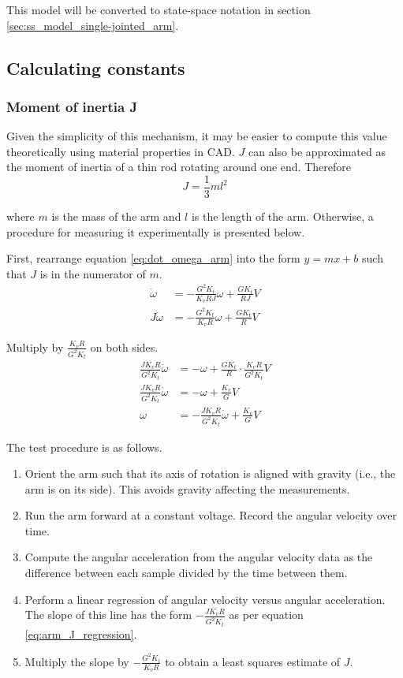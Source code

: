 This model will be converted to state-space notation in section
\ref{sec:ss_model_single-jointed_arm}.

\subsection{Calculating constants}

\subsubsection{Moment of inertia J}

Given the simplicity of this mechanism, it may be easier to compute this value
theoretically using material properties in CAD. $J$ can also be approximated as
the moment of inertia of a thin rod rotating around one end. Therefore
\begin{equation}
  J = \frac{1}{3}ml^2
\end{equation}

where $m$ is the mass of the arm and $l$ is the length of the arm. Otherwise, a
procedure for measuring it experimentally is presented below.

First, rearrange equation \eqref{eq:dot_omega_arm} into the form $y = mx + b$
such that $J$ is in the numerator of $m$.
\begin{align*}
  \dot{\omega} &= -\frac{G^2 K_t}{K_v RJ} \omega + \frac{G K_t}{RJ} V \\
  J\dot{\omega} &= -\frac{G^2 K_t}{K_v R} \omega + \frac{G K_t}{R} V
\end{align*}

Multiply by $\frac{K_v R}{G^2 K_t}$ on both sides.
\begin{align}
  \frac{J K_v R}{G^2 K_t} \dot{\omega} &= -\omega + \frac{G K_t}{R} \cdot
    \frac{K_v R}{G^2 K_t} V \nonumber \\
  \frac{J K_v R}{G^2 K_t} \dot{\omega} &= -\omega + \frac{K_v}{G} V \nonumber \\
  \omega &= -\frac{J K_v R}{G^2 K_t} \dot{\omega} + \frac{K_v}{G} V
    \label{eq:arm_J_regression}
\end{align}

The test procedure is as follows.
\begin{enumerate}
  \item Orient the arm such that its axis of rotation is aligned with gravity
    (i.e., the arm is on its side). This avoids gravity affecting the
    measurements.
  \item Run the arm forward at a constant voltage. Record the angular velocity
    over time.
  \item Compute the angular acceleration from the angular velocity data as the
    difference between each sample divided by the time between them.
  \item Perform a linear regression of angular velocity versus angular
    acceleration. The slope of this line has the form $-\frac{J K_v R}{G^2 K_t}$
    as per equation \eqref{eq:arm_J_regression}.
  \item Multiply the slope by $-\frac{G^2 K_t}{K_v R}$ to obtain a least squares
    estimate of $J$.
\end{enumerate}

